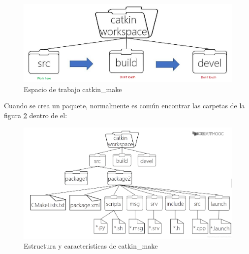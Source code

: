            \begin{figure}[htb]
                \centering
                \includegraphics[width=0.8\linewidth]{Main/Chapter3/Images3/n_s_a_3.png}
                \caption{Espacio de trabajo catkin\_make \cite{cmake_blogcsdn}}
                \label{f:Cap3_conceptos_3}
            \end{figure} 
            
               \newpage


            Cuando se crea un paquete, normalmente es común encontrar las carpetas de la figura \ref{f:Cap3_conceptos_4} dentro de el:
            
            \begin{figure}[htb]
                \centering
                \includegraphics[width=1.0\linewidth]{Main/Chapter3/Images3/n_s_a_4.png}
                \caption{Estructura y características de catkin\_make \cite{cmake_blogcsdn}}
                \label{f:Cap3_conceptos_4}
            \end{figure} 

